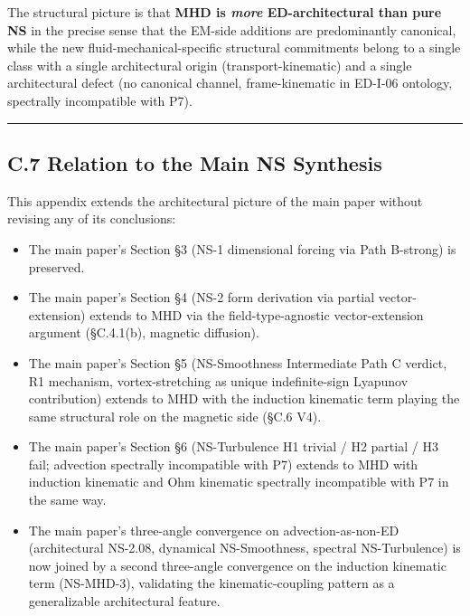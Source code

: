 \documentclass[
]{article}
\providecommand{\tightlist}{%
  \setlength{\itemsep}{0pt}\setlength{\parskip}{0pt}}
\begin{document}
The structural picture is that \textbf{MHD is \emph{more}
ED-architectural than pure NS} in the precise sense that the EM-side
additions are predominantly canonical, while the new
fluid-mechanical-specific structural commitments belong to a single
class with a single architectural origin (transport-kinematic) and a
single architectural defect (no canonical channel, frame-kinematic in
ED-I-06 ontology, spectrally incompatible with P7).

\begin{center}\rule{0.5\linewidth}{0.5pt}\end{center}

\subsection{C.7 Relation to the Main NS
Synthesis}\label{c.7-relation-to-the-main-ns-synthesis}

This appendix extends the architectural picture of the main paper
without revising any of its conclusions:

\begin{itemize}
\tightlist
\item
  The main paper's Section §3 (NS-1 dimensional forcing via Path
  B-strong) is preserved.
\item
  The main paper's Section §4 (NS-2 form derivation via partial
  vector-extension) extends to MHD via the field-type-agnostic
  vector-extension argument (§C.4.1(b), magnetic diffusion).
\item
  The main paper's Section §5 (NS-Smoothness Intermediate Path C
  verdict, R1 mechanism, vortex-stretching as unique indefinite-sign
  Lyapunov contribution) extends to MHD with the induction kinematic
  term playing the same structural role on the magnetic side (§C.6 V4).
\item
  The main paper's Section §6 (NS-Turbulence H1 trivial / H2 partial /
  H3 fail; advection spectrally incompatible with P7) extends to MHD
  with induction kinematic and Ohm kinematic spectrally incompatible
  with P7 in the same way.
\item
  The main paper's three-angle convergence on advection-as-non-ED
  (architectural NS-2.08, dynamical NS-Smoothness, spectral
  NS-Turbulence) is now joined by a second three-angle convergence on
  the induction kinematic term (NS-MHD-3), validating the
  kinematic-coupling pattern as a generalizable architectural feature.
\end{itemize}
\end{document}
